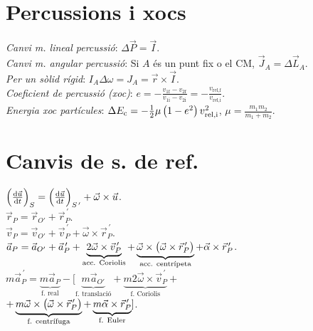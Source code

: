 \section{Percussions i xocs}
\emph{Canvi m. lineal percussió}: $\Delta \vec{P} = \vec{I}$.\\
\emph{Canvi m. angular percussió}: Si $A$ és un punt fix o el CM, $\vec{J}_A = \Delta \vec{L}_A$.\\
\emph{Per un sòlid rígid}: $I_A \Delta \omega = J_A = \vec{r}\times \vec{I}$.\\
\emph{Coeficient de percussió (xoc)}: $e = - \frac{v_{1\text{f}} - v_{2\text{f}}}{v_{1\text{i}} - v_{2\text{i}}}=-\frac{v_{\text{rel,f}}}{v_{\text{rel,i}}}$.\\
\emph{Energia xoc partícules}: $\Delta E_\text{c} = -\frac{1}{2} \mu \left( 1 - e^2 \right) v_\text{rel,i}^2$, $\mu=\frac{m_1m_2}{m_1+m_2}$.


\section{Canvis de s. de ref.}
\ci $\lp \frac{\dif \vec{u}}{\dif t} \rp_S=\lp \frac{\dif \vec{u}}{\dif t} \rp_{S^{\, \prime}}+\vec{\omega}\times \vec{u}$. \\
\ci $\vec{r}_P = \vec{r}_{O'} + \vec{r}_{P}^{\, \prime}$. \\
\ci $\vec{v}_P = \vec{v}_{O'} + \vec{v}_{P}^{\, \prime} + \vec{\omega}\times\vec{r}_{P}^{\, \prime}$. \\
\ci $\vec{a}_P = \vec{a}_{O'} + \vec{a}_{P}^{\, \prime} + \underbrace{2\vec{\omega}\times\vec{v}_{P}^{\, \prime}}_{\text{acc. Coriolis}} + \underbrace{\vec{\omega}\times \left( \vec{\omega}\times \vec{r}_{P}^{\, \prime} \right)}_{\text{acc. centrípeta}} + \vec{\alpha}\times\vec{r}_{P}^{\, \prime}$. \\
\ci $m\vec{a}_{P}^{\, \prime} = \underbrace{m\vec{a}_P}_{\text{f. real}} - [\underbrace{m\vec{a}_{O'}}_{\text{f. translació}} + \underbrace{m2\vec{\omega}\times\vec{v}_{P}^{\, \prime}}_{\text{f. Coriolis}} +$ \\
\qquad $+\underbrace{m\vec{\omega}\times \left( \vec{\omega}\times \vec{r}_{P}^{\, \prime} \right)}_{\text{f. centrífuga}} + \underbrace{m\vec{\alpha}\times\vec{r}_{P}^{\, \prime}}_{\text{f. Euler}} ]$.


